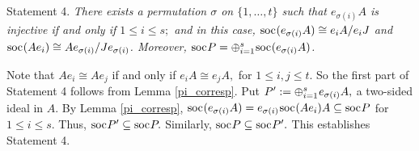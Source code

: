 \documentclass[10pt]{amsart}
\theoremstyle{definition}
\newcommand{\soc}{{\rm soc}\hspace{.5pt}}
\begin{document}
{\sc Statement 4.} {\it There exists a permutation $\sigma$ on $\{1, \ldots, t\}$ such that $e_{\sigma(i)}A$ is injective if and only if $1\le i\le s;$ and in this case, $\soc(e_{\sigma(i)}A)\cong e_iA/e_iJ$ and $\soc(Ae_i)\cong Ae_{\sigma(i)}/Je_{\sigma(i)}$.  Moreover, $\soc P=\oplus_{i=1}^s \hspace{.5pt} \soc(e_{\sigma(i)}A)$. }

Note that $Ae_i\cong Ae_j$ if and only if $e_iA\cong e_jA,$ for $1\le i, j\le t.$ So the first part of Statement 4 follows from Lemma \ref{pi_corresp}. Put $P':=\oplus_{i=1}^s \hspace{.5pt} e_{\sigma(i)}A,$ a two-sided ideal in $A$. By Lemma \ref{pi_corresp}, $\soc(e_{\sigma(i)}A)=e_{\sigma(i)} \hspace{.6pt} \soc(Ae_i) A \subseteq \soc P$ for $1\le i\le s$. Thus, $\soc P'\subseteq \soc P.$ Similarly, $\soc P\subseteq \soc P'.$ This establishes Statement 4.
\end{document}
